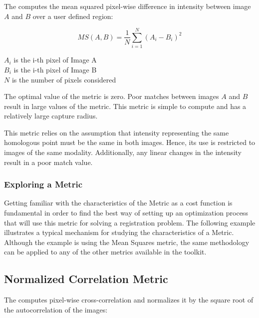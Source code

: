 The  computes the mean squared
pixel-wise difference in intensity between image $A$ and $B$ over a user
defined region:

\begin{equation}
MS(A,B) = \frac{1}{N} \sum_{i=1}^N \left( A_i - B_i \right)^2
\end{equation}
\begin{center}
$A_i$ is the i-th pixel of Image A\\ 
$B_i$ is the i-th pixel of Image B\\
$N$ is the number of pixels considered
\end{center}

The optimal value of the metric is zero. Poor matches between images $A$ and
$B$ result in large values of the metric. This metric is simple to compute and
has a relatively large capture radius.

This metric relies on the assumption that intensity representing the same
homologous point must be the same in both images. Hence, its use is restricted
to images of the same modality. Additionally, any linear changes in the
intensity result in a poor match value.

\subsubsection{Exploring a Metric}
\label{sec:ExploringAMetric}

Getting familiar with the characteristics of the Metric as a cost function is
fundamental in order to find the best way of setting up an optimization process
that will use this metric for solving a registration problem. The following
example illustrates a typical mechanism for studying the characteristics of a
Metric. Although the example is using the Mean Squares metric, the same
methodology can be applied to any of the other metrics available in the
toolkit.

\ifitkFullVersion

\fi


\subsection{Normalized Correlation Metric}
\label{sec:NormalizedCorrelationMetric}

The  computes pixel-wise
cross-correlation and normalizes it by the square root of the autocorrelation
of the images:

